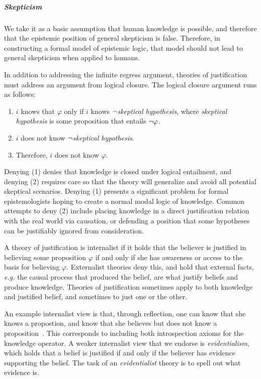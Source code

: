 \subparagraph{Skepticism}
We take it as a basic assumption that human knowledge is possible, and therefore that the epistemic position of general skepticism is false. Therefore, in constructing a formal model of epistemic logic, that model should not lead to general skepticism when applied to humans. 

In addition to addressing the infinite regress argument, theories of justification must address an argument from logical closure. The logical closure argument runs as follows:
\begin{enumerate}
	\item $i$ knows that $\varphi$ only if $i$ knows ${\neg}$\emph{skeptical hypothesis}, where \emph{skeptical hypothesis} is some proposition that entails ${\neg} \varphi$.
	\item $i$ does not know ${\neg}$\emph{skeptical hypothesis}.
	\item Therefore, $i$ does not know $\varphi$.
\end{enumerate}

Denying (1) denies that knowledge is closed under logical entailment, and denying (2) requires care so that the theory will generalize and avoid all potential skeptical scenarios. Denying (1) presents a significant problem for formal epistemologists hoping to create a normal modal logic of knowledge. Common attempts to deny (2) include placing knowledge in a direct justification relation with the real world via causation, or defending a position that some hypotheses can be justifiably ignored from consideration. 

A theory of justification is internalist if it holds that the believer is justified in believing some proposition $\varphi$ if and only if she has awareness or access to the basis for believing $\varphi$. Externalist theories deny this, and hold that external facts, \emph{e.g.} the causal process that produced the belief, are what justify beliefs and produce knowledge. Theories of justification sometimes apply to both knowledge and justified belief, and sometimes to just one or the other.

An example internalist view is that, through reflection, one can know that she knows a propostion, and know that she believes but does not know a proposition~\cite{Prichard}. This corresponds to including both introspection axioms for the knowledge operator. A weaker internalist view that we endorse is \emph{evidentialism}, which holds that a belief is justified if and only if the believer has evidence supporting the belief. The task of an \emph{evidentialist} theory is to spell out what evidence is.

